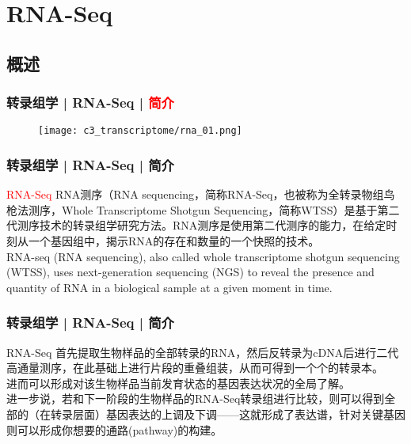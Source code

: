 \section{RNA-Seq}
\subsection{概述}
\begin{frame}
  \frametitle{转录组学 | RNA-Seq | \textcolor{red}{简介}}
  \begin{figure}
    \centering
    \texttt{[image: c3\_transcriptome/rna\_01.png]}
  \end{figure}
\end{frame}

\begin{frame}
  \frametitle{转录组学 | RNA-Seq | 简介}
  \begin{block}{\textcolor{red}{RNA-Seq}}
 RNA测序（RNA sequencing，简称RNA-Seq，也被称为全转录物组鸟枪法测序，Whole Transcriptome Shotgun Sequencing，简称WTSS）是基于第二代测序技术的转录组学研究方法。RNA测序是使用第二代测序的能力，在给定时刻从一个基因组中，揭示RNA的存在和数量的一个快照的技术。\\
 \vspace{1em}
RNA-seq (RNA sequencing), also called whole transcriptome shotgun sequencing (WTSS), uses next-generation sequencing (NGS) to reveal the presence and quantity of RNA in a biological sample at a given moment in time.
  \end{block}
\end{frame}

\begin{frame}
  \frametitle{转录组学 | RNA-Seq | 简介}
  \begin{block}{RNA-Seq}
首先提取生物样品的全部转录的RNA，然后反转录为cDNA后进行二代高通量测序，在此基础上进行片段的重叠组装，从而可得到一个个的转录本。\\
\vspace{0.5em}
进而可以形成对该生物样品当前发育状态的基因表达状况的全局了解。\\
\vspace{0.5em}
进一步说，若和下一阶段的生物样品的RNA-Seq转录组进行比较，则可以得到全部的（在转录层面）基因表达的上调及下调——这就形成了表达谱，针对关键基因则可以形成你想要的通路(pathway)的构建。
  \end{block}
\end{frame}

